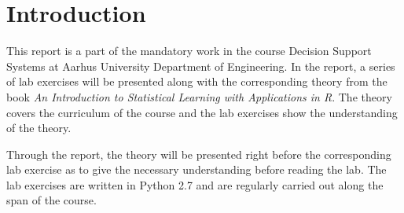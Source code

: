 \chapter{Introduction}
\label{chp:intro}

This report is a part of the mandatory work in the course Decision Support Systems at Aarhus University Department of Engineering.
In the report, a series of lab exercises will be presented along with the corresponding theory from the book \emph{An Introduction to Statistical Learning with Applications in R}\cite{ISLR}. 
The theory covers the curriculum of the course and the lab exercises show the understanding of the theory. 

Through the report, the theory will be presented right before the corresponding lab exercise as to give the necessary understanding before reading the lab. The lab exercises are written in Python 2.7 and are regularly carried out along the span of the course. 